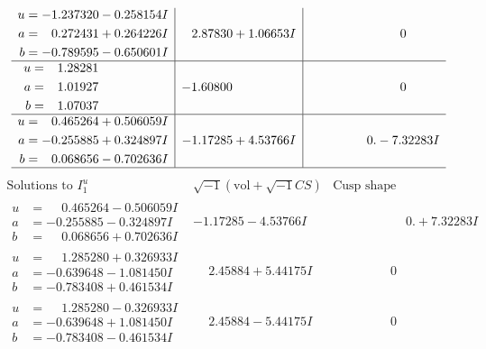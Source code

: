 \documentclass[1p]{elsarticle_modified}
\theoremstyle{definition}
\newcommand{\I}{\sqrt{-1}}
\begin{document}
$$\begin{array}{c|c|c}
\begin{aligned}
u &= -1.237320 - 0.258154 I \\
a &= \phantom{-}0.272431 + 0.264226 I \\
b &= -0.789595 - 0.650601 I\end{aligned}
 & \phantom{-}2.87830 + 1.06653 I & \phantom{-0.000000 } 0 \\ \hline\begin{aligned}
u &= \phantom{-}1.28281\phantom{ +0.000000I} \\
a &= \phantom{-}1.01927\phantom{ +0.000000I} \\
b &= \phantom{-}1.07037\phantom{ +0.000000I}\end{aligned}
 & -1.60800\phantom{ +0.000000I} & \phantom{-0.000000 } 0 \\ \hline\begin{aligned}
u &= \phantom{-}0.465264 + 0.506059 I \\
a &= -0.255885 + 0.324897 I \\
b &= \phantom{-}0.068656 - 0.702636 I\end{aligned}
 & -1.17285 + 4.53766 I & \phantom{-0.000000 } 0. - 7.32283 I\\
 \hline 
 \end{array}$$\newpage$$\begin{array}{c|c|c}  
\text{Solutions to }I^u_{1}& \I (\text{vol} + \sqrt{-1}CS) & \text{Cusp shape}\\
 \hline 
\begin{aligned}
u &= \phantom{-}0.465264 - 0.506059 I \\
a &= -0.255885 - 0.324897 I \\
b &= \phantom{-}0.068656 + 0.702636 I\end{aligned}
 & -1.17285 - 4.53766 I & \phantom{-0.000000 -}0. + 7.32283 I \\ \hline\begin{aligned}
u &= \phantom{-}1.285280 + 0.326933 I \\
a &= -0.639648 - 1.081450 I \\
b &= -0.783408 + 0.461534 I\end{aligned}
 & \phantom{-}2.45884 + 5.44175 I & \phantom{-0.000000 } 0 \\ \hline\begin{aligned}
u &= \phantom{-}1.285280 - 0.326933 I \\
a &= -0.639648 + 1.081450 I \\
b &= -0.783408 - 0.461534 I\end{aligned}
 & \phantom{-}2.45884 - 5.44175 I & \phantom{-0.000000 } 0 \\ \hline\begin{aligned}

\end{aligned}
\end{array}$$
\end{document}
